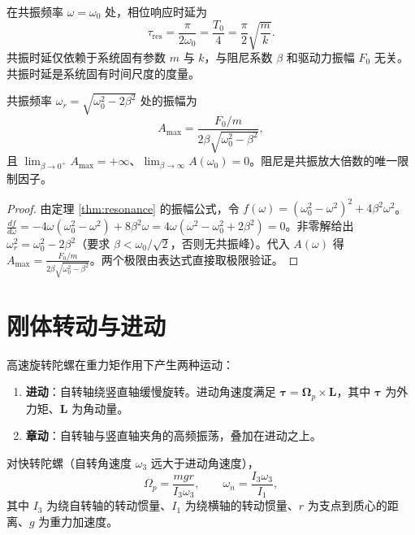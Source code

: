 \begin{proposition}[共振时延与系统参数的关系]\label{prop:resonance_delay_parameters}
在共振频率 $\omega = \omega_0$ 处，相位响应时延为
\[
\tau_{\text{res}} = \frac{\pi}{2\omega_0} = \frac{T_0}{4} = \frac{\pi}{2}\sqrt{\frac{m}{k}}.
\]
共振时延仅依赖于系统固有参数 $m$ 与 $k$，与阻尼系数 $\beta$ 和驱动力振幅 $F_0$ 无关。共振时延是系统固有时间尺度的度量。
\end{proposition}

\begin{lemma}[共振幅值的阻尼依赖]\label{ch23_resonance_amplitude}
共振频率 $\omega_r = \sqrt{\omega_0^2 - 2\beta^2}$ 处的振幅为
\[
A_{\max} = \frac{F_0/m}{2\beta\sqrt{\omega_0^2 - \beta^2}},
\]
且 $\lim_{\beta \to 0^+} A_{\max} = +\infty$、$\lim_{\beta \to \infty} A(\omega_0) = 0$。阻尼是共振放大倍数的唯一限制因子。
\end{lemma}

\begin{proof}
由定理 \ref{thm:resonance} 的振幅公式，令 $f(\omega) = (\omega_0^2 - \omega^2)^2 + 4\beta^2\omega^2$。$\frac{df}{d\omega} = -4\omega(\omega_0^2-\omega^2) + 8\beta^2\omega = 4\omega(\omega^2 - \omega_0^2 + 2\beta^2) = 0$。非零解给出 $\omega_r^2 = \omega_0^2 - 2\beta^2$（要求 $\beta < \omega_0/\sqrt{2}$，否则无共振峰）。代入 $A(\omega)$ 得 $A_{\max} = \frac{F_0/m}{2\beta\sqrt{\omega_0^2-\beta^2}}$。两个极限由表达式直接取极限验证。
\end{proof}

\section{刚体转动与进动}

\begin{definition}[陀螺的进动与章动]\label{def:gyroscope}
高速旋转陀螺在重力矩作用下产生两种运动：
\begin{enumerate}[label=(\roman*)]
    \item \textbf{进动}：自转轴绕竖直轴缓慢旋转。进动角速度满足 $\boldsymbol{\tau} = \boldsymbol{\Omega}_p \times \mathbf{L}$，其中 $\boldsymbol{\tau}$ 为外力矩、$\mathbf{L}$ 为角动量。
    \item \textbf{章动}：自转轴与竖直轴夹角的高频振荡，叠加在进动之上。
\end{enumerate}
\end{definition}

\begin{proposition}[进动频率与章动频率]\label{prop:precession_nutation}
对快转陀螺（自转角速度 $\omega_3$ 远大于进动角速度），
\[
\Omega_p = \frac{mgr}{I_3\omega_3}, \qquad \omega_n = \frac{I_3\omega_3}{I_1},
\]
其中 $I_3$ 为绕自转轴的转动惯量、$I_1$ 为绕横轴的转动惯量、$r$ 为支点到质心的距离、$g$ 为重力加速度。
\end{proposition}

